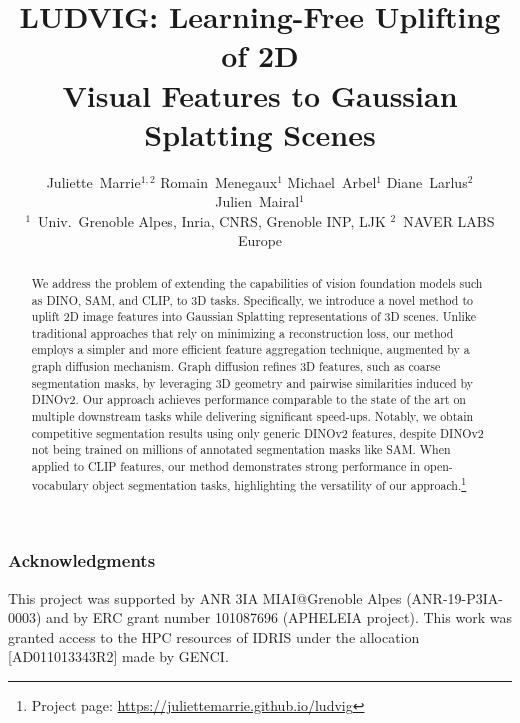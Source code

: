 \documentclass[10pt,twocolumn,letterpaper]{article}
\title{LUDVIG: Learning-Free Uplifting of 2D \\ Visual Features to Gaussian Splatting Scenes}
\author{
    Juliette~Marrie$^{1,2}$ 
    \hspace{0.1cm} Romain~Menegaux$^1$
    \hspace{0.1cm} Michael~Arbel$^1$
    \hspace{0.1cm} Diane~Larlus$^2$
    \hspace{0.1cm} Julien~Mairal$^1$\\
    $^1$~{Univ.\ Grenoble Alpes, Inria, CNRS, Grenoble INP, LJK} \hspace{1cm} $^2$~{NAVER LABS Europe}
}
\begin{document}
\maketitle
\begin{abstract}
We address the problem of extending the capabilities of vision foundation models such as DINO, SAM, and CLIP, to 3D tasks. Specifically, we introduce a novel method to uplift 2D image features into Gaussian Splatting representations of 3D scenes. 
Unlike traditional approaches that rely on minimizing a reconstruction loss, our method employs a simpler and more efficient feature aggregation technique, augmented by a graph diffusion mechanism. 
Graph diffusion refines 3D features, such as coarse segmentation masks, by leveraging 3D geometry and pairwise similarities induced by DINOv2.
Our approach achieves performance comparable to the state of the art on multiple downstream tasks while delivering significant speed-ups.
Notably, we obtain competitive segmentation results using only generic DINOv2 features, despite DINOv2 not being trained on millions of annotated segmentation masks like SAM.  When applied to CLIP features, our method demonstrates strong performance in open-vocabulary object segmentation tasks, highlighting the versatility of our approach.\footnote{\scriptsize{Project page: \url{https://juliettemarrie.github.io/ludvig}}}
\vspace{-.2cm}
\end{abstract}








\subsubsection*{Acknowledgments}
This project was supported by ANR 3IA MIAI@Grenoble Alpes (ANR-19-P3IA-0003) and by ERC grant number 101087696 (APHELEIA project). This work was granted access to the HPC resources of IDRIS under the allocation [AD011013343R2] made by GENCI.

{
    \small
    
    
}


\end{document}
